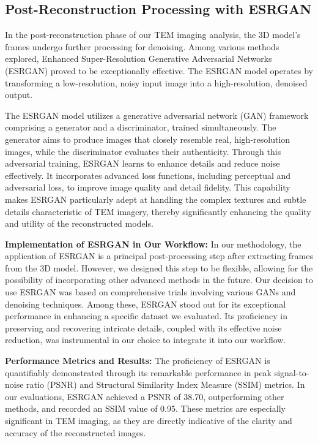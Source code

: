 \subsection{Post-Reconstruction Processing with ESRGAN}
In the post-reconstruction phase of our TEM imaging analysis, the 3D model's frames undergo further processing for denoising. Among various methods explored, Enhanced Super-Resolution Generative Adversarial Networks (ESRGAN)\cite{Xintao2018} proved to be exceptionally effective. The ESRGAN model operates by transforming a low-resolution, noisy input image into a high-resolution, denoised output. 
\vspace{10pt}

The ESRGAN model utilizes a generative adversarial network (GAN) framework comprising a generator and a discriminator, trained simultaneously. The generator aims to produce images that closely resemble real, high-resolution images, while the discriminator evaluates their authenticity. Through this adversarial training, ESRGAN learns to enhance details and reduce noise effectively. It incorporates advanced loss functions, including perceptual and adversarial loss, to improve image quality and detail fidelity. This capability makes ESRGAN particularly adept at handling the complex textures and subtle details characteristic of TEM imagery, thereby significantly enhancing the quality and utility of the reconstructed models.


\vspace{10pt}
\textbf{Implementation of ESRGAN in Our Workflow:} In our methodology, the application of ESRGAN is a principal post-processing step after extracting frames from the 3D model. However, we designed this step to be flexible, allowing for the possibility of incorporating other advanced methods in the future. Our decision to use ESRGAN was based on comprehensive trials involving various GANs and denoising techniques. Among these, ESRGAN stood out for its exceptional performance in enhancing a specific dataset we evaluated. Its proficiency in preserving and recovering intricate details, coupled with its effective noise reduction, was instrumental in our choice to integrate it into our workflow.

\vspace{10pt}
\textbf{Performance Metrics and Results:} The proficiency of ESRGAN is quantifiably demonstrated through its remarkable performance in peak signal-to-noise ratio (PSNR) and Structural Similarity Index Measure (SSIM) metrics. In our evaluations, ESRGAN achieved a PSNR of 38.70, outperforming other methods, and recorded an SSIM value of 0.95. These metrics are especially significant in TEM imaging, as they are directly indicative of the clarity and accuracy of the reconstructed images.



